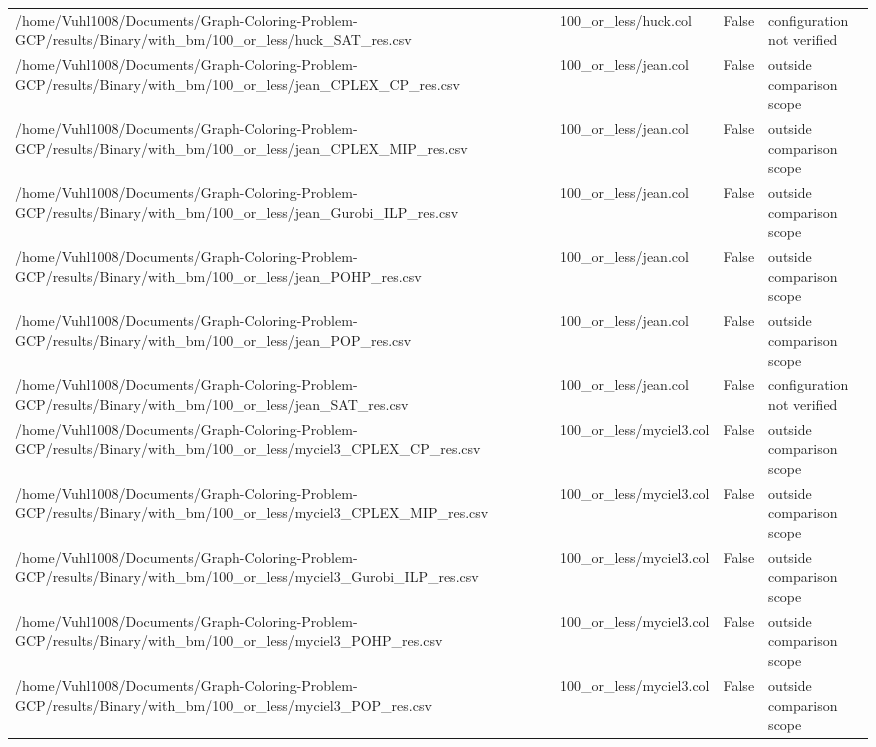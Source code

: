 \begin{table}[htbp]
\begin{tabular}{llll}
/home/Vuhl1008/Documents/Graph-Coloring-Problem-GCP/results/Binary/with\_bm/100\_or\_less/huck\_SAT\_res.csv & 100\_or\_less/huck.col & False & configuration not verified \\
/home/Vuhl1008/Documents/Graph-Coloring-Problem-GCP/results/Binary/with\_bm/100\_or\_less/jean\_CPLEX\_CP\_res.csv & 100\_or\_less/jean.col & False & outside comparison scope \\
/home/Vuhl1008/Documents/Graph-Coloring-Problem-GCP/results/Binary/with\_bm/100\_or\_less/jean\_CPLEX\_MIP\_res.csv & 100\_or\_less/jean.col & False & outside comparison scope \\
/home/Vuhl1008/Documents/Graph-Coloring-Problem-GCP/results/Binary/with\_bm/100\_or\_less/jean\_Gurobi\_ILP\_res.csv & 100\_or\_less/jean.col & False & outside comparison scope \\
/home/Vuhl1008/Documents/Graph-Coloring-Problem-GCP/results/Binary/with\_bm/100\_or\_less/jean\_POHP\_res.csv & 100\_or\_less/jean.col & False & outside comparison scope \\
/home/Vuhl1008/Documents/Graph-Coloring-Problem-GCP/results/Binary/with\_bm/100\_or\_less/jean\_POP\_res.csv & 100\_or\_less/jean.col & False & outside comparison scope \\
/home/Vuhl1008/Documents/Graph-Coloring-Problem-GCP/results/Binary/with\_bm/100\_or\_less/jean\_SAT\_res.csv & 100\_or\_less/jean.col & False & configuration not verified \\
/home/Vuhl1008/Documents/Graph-Coloring-Problem-GCP/results/Binary/with\_bm/100\_or\_less/myciel3\_CPLEX\_CP\_res.csv & 100\_or\_less/myciel3.col & False & outside comparison scope \\
/home/Vuhl1008/Documents/Graph-Coloring-Problem-GCP/results/Binary/with\_bm/100\_or\_less/myciel3\_CPLEX\_MIP\_res.csv & 100\_or\_less/myciel3.col & False & outside comparison scope \\
/home/Vuhl1008/Documents/Graph-Coloring-Problem-GCP/results/Binary/with\_bm/100\_or\_less/myciel3\_Gurobi\_ILP\_res.csv & 100\_or\_less/myciel3.col & False & outside comparison scope \\
/home/Vuhl1008/Documents/Graph-Coloring-Problem-GCP/results/Binary/with\_bm/100\_or\_less/myciel3\_POHP\_res.csv & 100\_or\_less/myciel3.col & False & outside comparison scope \\
/home/Vuhl1008/Documents/Graph-Coloring-Problem-GCP/results/Binary/with\_bm/100\_or\_less/myciel3\_POP\_res.csv & 100\_or\_less/myciel3.col & False & outside comparison scope \\

\end{tabular}
\end{table}
